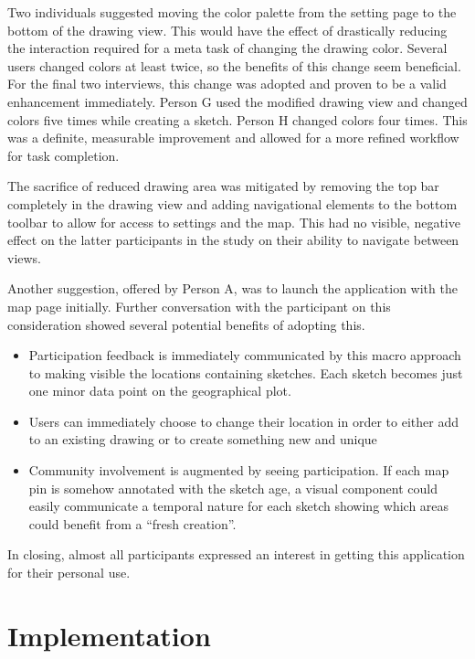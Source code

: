 \documentclass{chi2009}
\begin{document}
Two individuals suggested moving the color palette from the setting page to the
bottom of the drawing view. This would have the effect of drastically reducing the interaction required for a meta task of changing the drawing color.  Several
users changed colors at least twice, so the benefits of this change seem
beneficial.  For the final two interviews, this change was adopted and proven
to be a valid enhancement immediately.  Person G used the modified drawing view
and changed colors five times while creating a sketch.  Person H changed colors
four times.  This was a definite, measurable improvement and allowed for a more
refined workflow for task completion.

The sacrifice of reduced drawing area was mitigated by removing the top bar
completely in the drawing view and adding navigational elements to the bottom
toolbar to allow for access to settings and the map.  This had no visible,
negative effect on the latter participants in the study on their ability to
navigate between views.

Another suggestion, offered by Person A, was to launch the application with the
map page initially.  Further conversation with the participant on this
consideration showed several potential benefits of adopting this.
\begin{itemize}
\item Participation feedback is immediately communicated by this macro approach
to making visible the locations containing sketches.  Each sketch becomes just
one minor data point on the geographical plot.
\item Users can immediately choose to change their location in order to either
add to an existing drawing or to create something new and unique
\item Community involvement is augmented by seeing participation.  If each map
pin is somehow annotated with the sketch age, a visual component could easily
communicate a temporal nature for each sketch showing which areas could benefit
from a ``fresh creation''.
\end{itemize}

In closing, almost all participants expressed an interest in getting this
application for their personal use.



\section{Implementation}
\end{document}
